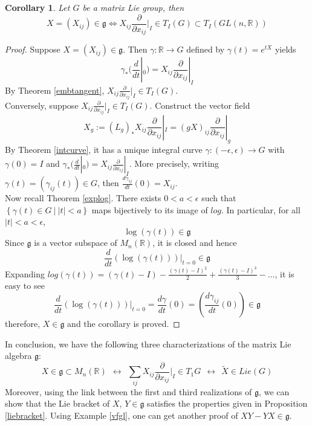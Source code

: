\documentclass[11pt]{article}
\newtheorem{corollary}[theorem]{Corollary}
\newcommand{\bb}[1]{\mathbb{#1}}
\newcommand{\mf}[1]{\mathfrak{#1}}
\begin{document}
\begin{corollary}
Let $G$ be a matrix Lie group, then
$$X = (X_{ij})\in \mf{g} \Longleftrightarrow X_{ij}\frac{\partial}{\partial x_{ij}}|_I \in T_I(G) \subset T_I(GL(n,\bb{R}))$$
\end{corollary}
\begin{proof}
Suppose $X = (X_{ij})\in \mf{g}$. Then $\gamma: \bb{R} \to G$ defined by $\gamma(t) = e^{tX}$ yields
$$\gamma_*(\frac{d}{dt}|_0) = X_{ij}\frac{\partial}{\partial x_{ij}}|_I$$
By Theorem \ref{embtangent}, $X_{ij}\frac{\partial}{\partial x_{ij}}|_I \in T_I(G)$.\\

\noindent Conversely, suppose $X_{ij}\frac{\partial}{\partial x_{ij}}|_I \in T_I(G)$. Construct the vector field
$$X_g := (L_g)_*X_{ij}\frac{\partial}{\partial x_{ij}}|_I = (gX)_{ij}\frac{\partial}{\partial x_{ij}}|_g$$
By Theorem \ref{intcurve}, it has a unique integral curve $\gamma: (-\epsilon, \epsilon) \to G$
with $\gamma(0) = I$ and $\gamma_*(\frac{d}{dt}|_{0}) = X_{ij}\frac{\partial}{\partial x_{ij}}|_{I}$. More precisely, writing $\gamma(t) = (\gamma_{ij}(t)) \in G$, then $\frac{d\gamma_{ij}}{dt}(0) = X_{ij}$.\\

\noindent Now recall Theorem \ref{explog}. There exists $0 < a < \epsilon$ such that $\left\{ \gamma(t) \in G\ \Big|\ |t|<a \right\}$ maps bijectively to its image of $log$. In particular, for all $|t| < a < \epsilon$,
$$\log(\gamma(t)) \in \mf{g}$$
Since $\mf{g}$ is a vector subspace of $M_n(\bb{R})$, it is closed and hence
$$\frac{d}{dt}(\log(\gamma(t)))|_{t= 0} \in \mf{g}$$
Expanding $log(\gamma(t)) = (\gamma(t) - I) - \frac{(\gamma(t) - I)^2}{2} + \frac{(\gamma(t) - I)^3}{3} - \dots$, it is easy to see
$$\frac{d}{dt}(\log(\gamma(t)))|_{t= 0} = \frac{d\gamma}{dt}(0) = (\frac{d\gamma_{ij}}{dt}(0)) \in \mf{g}$$
therefore, $X \in \mf{g}$ and the corollary is proved.
\end{proof}
In conclusion, we have the following three characterizations of the matrix Lie algebra $\mf{g}$:
$$X \in \mf{g} \subset M_{n}(\bb{R})\ \ \longleftrightarrow\ \  \sum_{ij} X_{ij}\frac{\partial}{\partial x_{ij}}|_I \in T_1G\ \  \longleftrightarrow\ \  \tilde{X} \in Lie(G)$$
Moreover, using the link between the first and third realizations of $\mf{g}$, we can show that the Lie bracket of $X$, $Y \in \mf{g}$ satisfies the properties given in Proposition \ref{liebracket}. Using Example \ref{vfgl}, one can get another proof of $XY - YX \in \mf{g}$.
\end{document}
